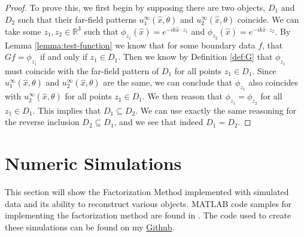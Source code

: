 \documentclass[]{article}
\newcommand{\R}{\mathbb R}
\begin{document}
			\begin{proof}
				To prove this, we first begin by supposing there are two objects, $D_1$ and $D_2$ such that their far-field patterns $u_1^\infty(\hat x, \theta)$ and $u_2^\infty(\hat x, \theta)$ coincide. We can take some $z_1, z_2\in \R^3$ such that $\phi_{z_1}(\hat x) = e^{-ik\hat x \cdot z_1}$ and $\phi_{z_2}(\hat x) = e^{-ik\hat x \cdot z_2}$. By Lemma \ref{lemma:test-function} we know that for some boundary data $f$, that $Gf = \phi_{z_1}$ if and only if $z_1 \in D_1$. Then we know by Definition \ref{def:G} that $\phi_{z_1}$ must coincide with the far-field pattern of $D_1$ for all points $z_1 \in D_1$. Since $u_1^\infty(\hat x, \theta)$ and $u_2^\infty(\hat x, \theta)$ are the same, we can conclude that $\phi_{z_1}$ also coincides with $u_2^\infty(\hat x, \theta)$ for all points $z_1\in D_1$. We then reason that $\phi_{z_1} = \phi_{z_2}$ for all $z_1\in D_1$. This implies that $D_1 \subseteq D_2$. We can use exactly the same reasoning for the reverse inclusion $D_2 \subseteq D_1$, and we see that indeed $D_1 = D_2$.
			\end{proof}
		\section{Numeric Simulations}
			This section will show the Factorization Method implemented with simulated data and its ability to reconstruct various objects. MATLAB code samples for implementing the factorization method are found in \cite{potthast2015}. The code used to create these simulations can be found on my \href{https://github.com/KaleStahl/Honors-Project}{Github}.
\end{document}
